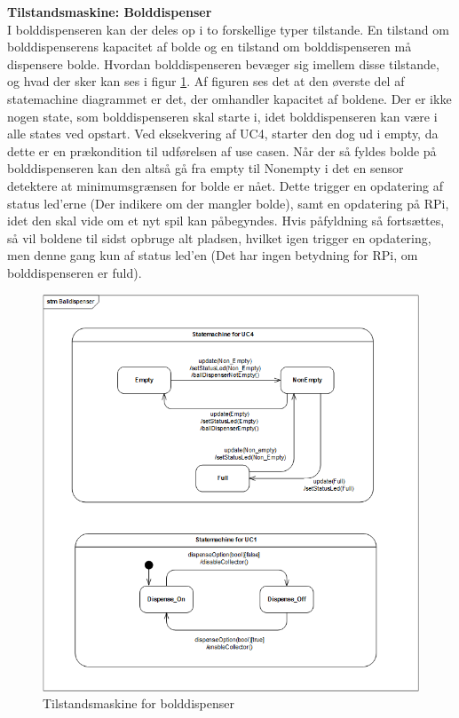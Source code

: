 \documentclass[Arkitektur/System_main.tex]{subfiles}
\begin{document}
\textbf{Tilstandsmaskine: Bolddispenser}\\
I bolddispenseren kan der deles op i to forskellige typer tilstande. En tilstand om bolddispenserens kapacitet af bolde og en tilstand om bolddispenseren må dispensere bolde. Hvordan bolddispenseren bevæger sig imellem disse tilstande, og hvad der sker kan ses i figur \ref{fig:stm_balldispenser}. 
Af figuren ses det at den øverste del af statemachine diagrammet er det, der omhandler kapacitet af boldene. Der er ikke nogen state, som bolddispenseren skal starte i, idet bolddispenseren kan være i alle states ved opstart. Ved eksekvering af UC4, starter den dog ud i empty, da dette er en prækondition til udførelsen af use casen. 
Når der så fyldes bolde på bolddispenseren kan den altså gå fra empty til Nonempty i det en sensor detektere at minimumsgrænsen for bolde er nået. Dette trigger en opdatering af status led'erne (Der indikere om der mangler bolde), samt en opdatering på RPi, idet den skal vide om et nyt spil kan påbegyndes. 
Hvis påfyldning så fortsættes, så vil boldene til sidst opbruge alt pladsen, hvilket igen trigger en opdatering, men denne gang kun af status led'en (Det har ingen betydning for RPi, om bolddispenseren er fuld).
\begin{figure}[H]
    \centering
    \includegraphics[width=\textwidth]{Arkitektur/Softwarearkitektur/Applikationsmodel/BallDispenser/graphicsBallDispenser/ApplikationsmodelBolddispenserstm.PNG}
    \caption{Tilstandsmaskine for bolddispenser}
    \label{fig:stm_balldispenser}
\end{figure}
\newpage
\end{document}
